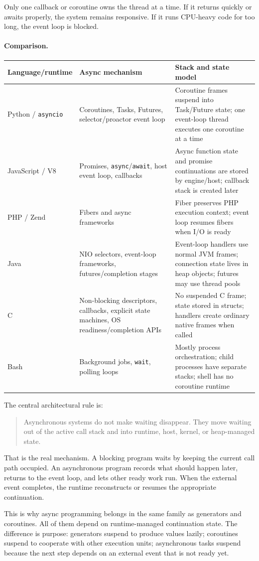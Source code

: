Only one callback or coroutine owns the thread at a time. If it returns quickly or awaits properly, the system remains responsive. If it runs CPU-heavy code for too long, the event loop is blocked.

\paragraph{Comparison.}

\begin{center}
\begin{tabular}{|p{}|p{}|p{}|}
\hline
\textbf{Language/runtime} & \textbf{Async mechanism} & \textbf{Stack and state model} \\
\hline
Python / \texttt{asyncio} & Coroutines, Tasks, Futures, selector/proactor event loop & Coroutine frames suspend into Task/Future state; one event-loop thread executes one coroutine at a time \\
\hline
JavaScript / V8 & Promises, \texttt{async}/\texttt{await}, host event loop, callbacks & Async function state and promise continuations are stored by engine/host; callback stack is created later \\
\hline
PHP / Zend & Fibers and async frameworks & Fiber preserves PHP execution context; event loop resumes fibers when I/O is ready \\
\hline
Java & NIO selectors, event-loop frameworks, futures/completion stages & Event-loop handlers use normal JVM frames; connection state lives in heap objects; futures may use thread pools \\
\hline
C & Non-blocking descriptors, callbacks, explicit state machines, OS readiness/completion APIs & No suspended C frame; state stored in structs; handlers create ordinary native frames when called \\
\hline
Bash & Background jobs, \texttt{wait}, polling loops & Mostly process orchestration; child processes have separate stacks; shell has no coroutine runtime \\
\hline
\end{tabular}
\end{center}

The central architectural rule is:

\begin{quote}
Asynchronous systems do not make waiting disappear. They move waiting out of the active call stack and into runtime, host, kernel, or heap-managed state.
\end{quote}

That is the real mechanism. A blocking program waits by keeping the current call path occupied. An asynchronous program records what should happen later, returns to the event loop, and lets other ready work run. When the external event completes, the runtime reconstructs or resumes the appropriate continuation.

This is why async programming belongs in the same family as generators and coroutines. All of them depend on runtime-managed continuation state. The difference is purpose: generators suspend to produce values lazily; coroutines suspend to cooperate with other execution units; asynchronous tasks suspend because the next step depends on an external event that is not ready yet.
